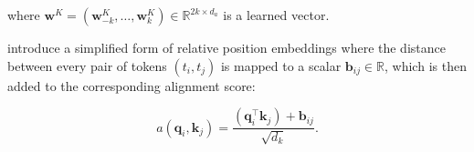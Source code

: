 \noindent where $\bm{w}^K = (\bm{w}^K_{-k}, \ldots, \bm{w}^K_{k}) \in \mathbb{R}^{2k \times d_a}$ is a learned vector.

\citet{raffel2020exploring} introduce a simplified form of relative position embeddings where the distance between every pair of tokens $(t_i, t_j)$ is mapped to a scalar $\bm{b}_{ij} \in \mathbb{R}$, which is then added to the corresponding alignment score:

\begin{equation}
    a(\bm{q}_i, \bm{k}_j) = \frac{(\bm{q}_i^{\top} \bm{k}_j) + \bm{b}_{ij}}{\sqrt{d_k}}.
\end{equation}





